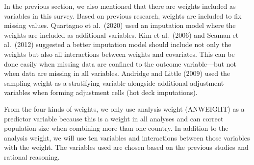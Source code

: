 \documentclass[
]{article}
\begin{document}
In the previous section, we also mentioned that there are weights
included as variables in this survey. Based on previous research,
weights are included to fix missing values. Quartagno et al.~(2020) used
an imputation model where the weights are included as additional
variables. Kim et al.~(2006) and Seaman et al.~(2012) suggested a better
imputation model should include not only the weights but also all
interactions between weights and covariates. This can be done easily
when missing data are confined to the outcome variable---but not when
data are missing in all variables. Andridge and Little (2009) used the
sampling weight as a stratifying variable alongside additional
adjustment variables when forming adjustment cells (hot deck
imputations).

From the four kinds of weights, we only use analysis weight (ANWEIGHT)
as a predictor variable because this is a weight in all analyses and can
correct population size when combining more than one country. In
addition to the analysis weight, we will use ten variables and
interactions between those variables with the weight. The variables used
are chosen based on the previous studies and rational reasoning.
\end{document}
